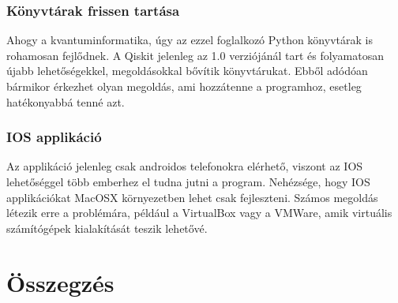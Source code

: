 \documentclass[
]{thesis-ekf}
\theoremstyle{definition}
\theoremstyle{remark}
\begin{document}
\subsection{Könyvtárak frissen tartása}
Ahogy a kvantuminformatika, úgy az ezzel foglalkozó Python könyvtárak is rohamosan fejlődnek. A Qiskit jelenleg az 1.0 verziójánál tart és folyamatosan újabb lehetőségekkel, megoldásokkal bővítik könyvtárukat. Ebből adódóan bármikor érkezhet olyan megoldás, ami hozzátenne a programhoz, esetleg hatékonyabbá tenné azt.

\subsection{IOS applikáció}
Az applikáció jelenleg csak androidos telefonokra elérhető, viszont az IOS lehetőséggel több emberhez el tudna jutni a program. Nehézsége, hogy IOS applikációkat MacOSX környezetben lehet csak fejleszteni. Számos megoldás létezik erre a problémára, például a VirtualBox vagy a VMWare, amik virtuális számítógépek kialakítását teszik lehetővé.

\chapter*{Összegzés}


\begin{thebibliography}{2}
\end{thebibliography}


\end{document}
